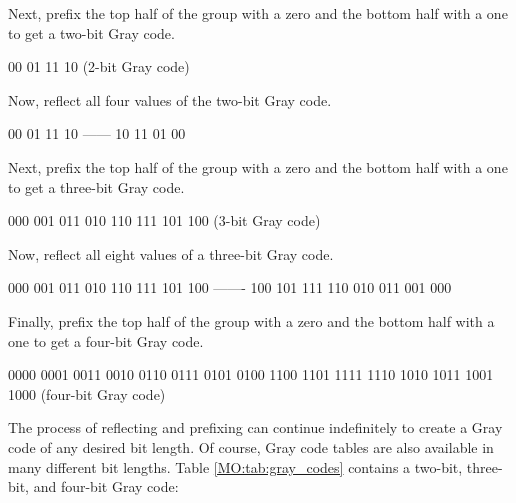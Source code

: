 Next, prefix the top half of the group with a zero and the bottom half with a one to get a two-bit Gray code. 

\begin{binDisp}
     00
     01
     11
     10  (2-bit Gray code)
\end{binDisp}

Now, reflect all four values of the two-bit Gray code.

\begin{binDisp}
     00
     01
     11
     10
   ------
     10
     11
     01
     00
\end{binDisp}

Next, prefix the top half of the group with a zero and the bottom half with a one to get a three-bit Gray code.

\begin{binDisp}
     000
     001
     011
     010
     110
     111
     101
     100  (3-bit Gray code)
\end{binDisp}

Now, reflect all eight values of a three-bit Gray code.

\begin{binDisp}
     000
     001
     011
     010
     110
     111
     101
     100
   -------
     100
     101
     111
     110
     010
     011
     001
     000
\end{binDisp}

Finally, prefix the top half of the group with a zero and the bottom half with a one to get a four-bit Gray code. 

\begin{binDisp}
     0000
     0001
     0011
     0010
     0110
     0111
     0101
     0100
     1100
     1101
     1111
     1110
     1010
     1011
     1001
     1000  (four-bit Gray code)
\end{binDisp}

The process of reflecting and prefixing can continue indefinitely to create a Gray code of any desired bit length. Of course, Gray code tables are also available in many different bit lengths. Table \ref{MO:tab:gray_codes} contains a two-bit, three-bit, and four-bit Gray code:

